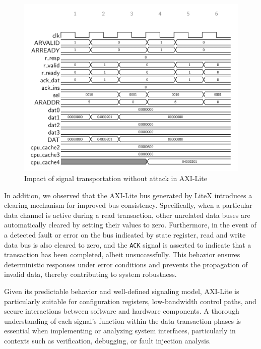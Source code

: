\begin{figure}[t!]
  \centering
  \includegraphics[width=\linewidth]{Chapitre3/figures/axilite.png}
  \caption{Impact of signal transportation without attack in AXI-Lite}
  \label{axilite}
\end{figure}

In addition, we observed that the AXI-Lite bus generated by LiteX introduces a clearing mechanism for improved bus consistency. Specifically, when a particular data channel is active during a read transaction, other unrelated data buses are automatically cleared by setting their values to zero. Furthermore, in the event of a detected fault or error on the bus indicated by state register, read and write data bus is also cleared to zero, and the \texttt{ACK} signal is asserted to indicate that a transaction has been completed, albeit unsuccessfully. This behavior ensures deterministic responses under error conditions and prevents the propagation of invalid data, thereby contributing to system robustness.

Given its predictable behavior and well-defined signaling model, AXI-Lite is particularly suitable for configuration registers, low-bandwidth control paths, and secure interactions between software and hardware components. A thorough understanding of each signal's function within the data transaction phases is essential when implementing or analyzing system interfaces, particularly in contexts such as verification, debugging, or fault injection analysis.

